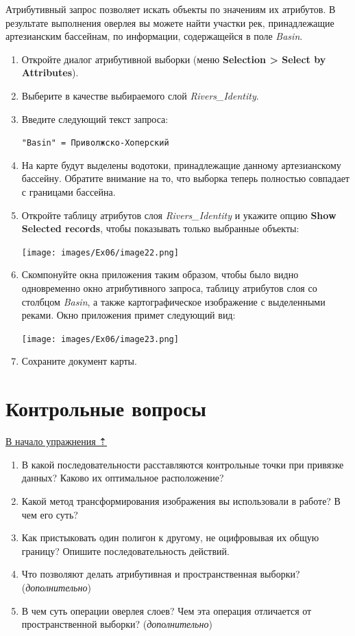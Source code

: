 \documentclass[12pt,]{book}
\begin{document}
Атрибутивный запрос позволяет искать объекты по значениям их атрибутов. В результате выполнения оверлея вы можете найти участки рек, принадлежащие артезианским бассейнам, по информации, содержащейся в поле \emph{Basin}.

\begin{enumerate}
\def\labelenumi{\arabic{enumi}.}
\item
  Откройте диалог атрибутивной выборки (меню \textbf{Selection \textgreater{} Select by Attributes}).
\item
  Выберите в качестве выбираемого слой \emph{Rivers\_Identity}.
\item
  Введите следующий текст запроса:

  \texttt{"Basin"\ =\ \textquotesingle{}Приволжско-Хоперский\textquotesingle{}}
\item
  На карте будут выделены водотоки, принадлежащие данному артезианскому бассейну. Обратите внимание на то, что выборка теперь полностью совпадает с границами бассейна.
\item
  Откройте таблицу атрибутов слоя \emph{Rivers\_Identity} и укажите опцию \textbf{Show Selected records}, чтобы показывать только выбранные объекты:

  \texttt{[image: images/Ex06/image22.png]}
\item
  Скомпонуйте окна приложения таким образом, чтобы было видно одновременно окно атрибутивного запроса, таблицу атрибутов слоя со столбцом \emph{Basin}, а также картографическое изображение с выделенными реками. Окно приложения примет следующий вид:

  \texttt{[image: images/Ex06/image23.png]}
\item
  Сохраните документ карты.
\end{enumerate}

\hypertarget{map-ref-hydrogeologic-questions}{%
\section{Контрольные вопросы}\label{map-ref-hydrogeologic-questions}}

\protect\hyperlink{map-ref-hydrogeologic}{В начало упражнения ⇡}

\begin{enumerate}
\def\labelenumi{\arabic{enumi}.}
\item
  В какой последовательности расставляются контрольные точки при привязке данных? Каково их оптимальное расположение?
\item
  Какой метод трансформирования изображения вы использовали в работе? В чем его суть?
\item
  Как пристыковать один полигон к другому, не оцифровывая их общую границу? Опишите последовательность действий.
\item
  Что позволяют делать атрибутивная и пространственная выборки? (\emph{дополнительно})
\item
  В чем суть операции оверлея слоев? Чем эта операция отличается от пространственной выборки? (\emph{дополнительно})
\end{enumerate}
\end{document}
